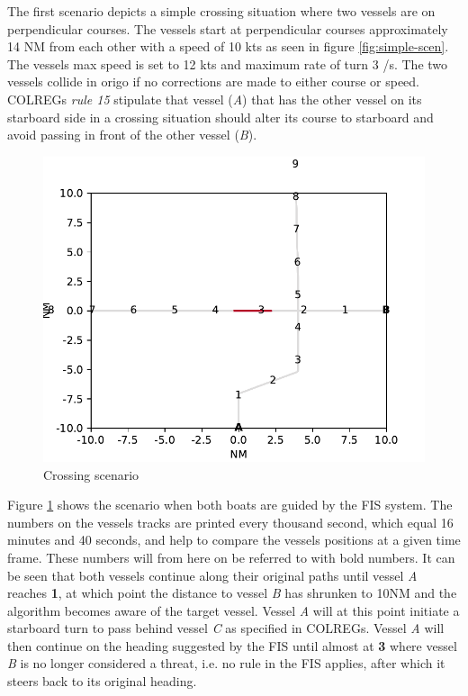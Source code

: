 The first scenario depicts a simple crossing situation where two vessels are on perpendicular courses. The vessels start at perpendicular courses approximately 14 NM from each other with a speed of 10 kts as seen in figure \ref{fig:simple-scen}. The vessels max speed is set to 12 kts and maximum rate of turn 3 \textdegree /s. The two vessels collide in origo if no corrections are made to either course or speed. COLREGs \textit{rule 15} stipulate that vessel (\textit{A}) that has the other vessel on its starboard side  in a crossing situation should alter its course to starboard and avoid passing in front of the other vessel (\textit{B}).
\begin{figure}[h]
    \centering
    \includegraphics[width=\textwidth,height=0.75\textheight,keepaspectratio]{Figures/Scenario/simple-scen-res.pdf}
    \caption{Crossing scenario}
    \label{fig:simple-scen-res}
\end{figure}

Figure \ref{fig:simple-scen-res} shows the scenario when both boats are guided by the FIS system. The numbers on the vessels tracks are printed every thousand second, which equal 16 minutes and 40 seconds, and help to compare the vessels positions at a given time frame. These numbers will from here on be referred to with bold numbers. It can be seen that both vessels continue along their original paths until vessel \textit{A} reaches \textbf{1}, at which point the distance to vessel \textit{B} has shrunken to 10NM and the algorithm becomes aware of the target vessel. Vessel \textit{A} will at this point initiate a starboard turn to pass behind vessel \textit{C} as specified in COLREGs. Vessel \textit{A} will then continue on the heading suggested by the FIS until almost at \textbf{3} where  vessel \textit{B} is no longer considered a threat, i.e. no rule in the FIS applies, after which it steers back to its original heading.

